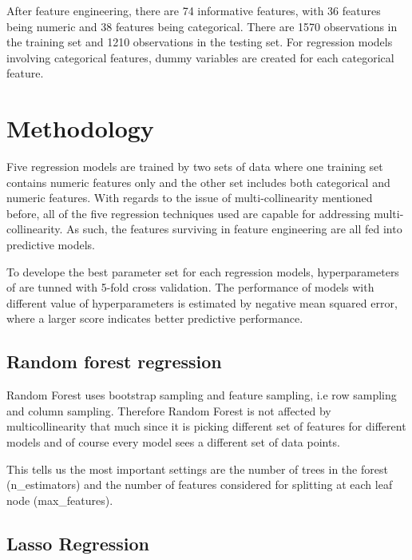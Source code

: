 \documentclass[letterpaper,12pt,twoside,]{pinp}
\begin{document}
After feature engineering, there are 74 informative features, with 36
features being numeric and 38 features being categorical. There are 1570
observations in the training set and 1210 observations in the testing
set. For regression models involving categorical features, dummy
variables are created for each categorical feature.

\hypertarget{methodology}{%
\section{Methodology}\label{methodology}}

Five regression models are trained by two sets of data where one
training set contains numeric features only and the other set includes
both categorical and numeric features. With regards to the issue of
multi-collinearity mentioned before, all of the five regression
techniques used are capable for addressing multi-collinearity. As such,
the features surviving in feature engineering are all fed into
predictive models.

To develope the best parameter set for each regression models,
hyperparameters of are tunned with 5-fold cross validation. The
performance of models with different value of hyperparameters is
estimated by negative mean squared error, where a larger score indicates
better predictive performance.

\hypertarget{random-forest-regression}{%
\subsection{Random forest regression}\label{random-forest-regression}}

Random Forest uses bootstrap sampling and feature sampling, i.e row
sampling and column sampling. Therefore Random Forest is not affected by
multicollinearity that much since it is picking different set of
features for different models and of course every model sees a different
set of data points.

This tells us the most important settings are the number of trees in the
forest (n\_estimators) and the number of features considered for
splitting at each leaf node (max\_features).

\hypertarget{lasso-regression}{%
\subsection{Lasso Regression}\label{lasso-regression}}
\end{document}
